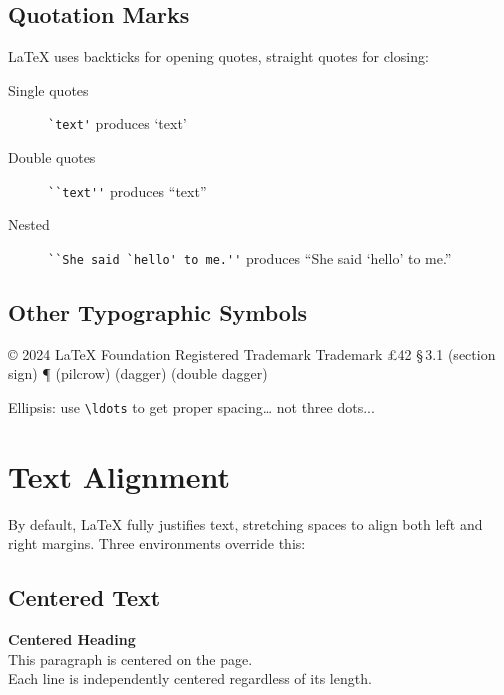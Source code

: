 \documentclass[12pt,a4paper]{article}
\begin{document}
\subsection{Quotation Marks}

\LaTeX{} uses backticks for opening quotes, straight quotes for closing:

\begin{description}
    \item[Single quotes] \verb|`text'| produces `text'
    \item[Double quotes] \verb|``text''| produces ``text''
    \item[Nested] \verb|``She said `hello' to me.''| produces ``She said `hello' to me.''
\end{description}

\subsection{Other Typographic Symbols}

\copyright{} 2024 LaTeX Foundation \quad
\textregistered{} Registered Trademark \quad
\texttrademark{} Trademark \quad
\pounds 42 \quad
\S\,3.1 (section sign) \quad
\P{} (pilcrow) \quad
\dag{} (dagger) \quad
\ddag{} (double dagger)

\medskip
\noindent Ellipsis: use \verb|\ldots| to get proper spacing\ldots{} not three dots...


\section{Text Alignment}
\label{sec:alignment}

By default, \LaTeX{} fully justifies text, stretching spaces to align both
left and right margins. Three environments override this:

\subsection{Centered Text}

\begin{center}
    \textbf{Centered Heading}\\
    This paragraph is centered on the page.\\
    Each line is independently centered regardless of its length.
\end{center}
\end{document}
